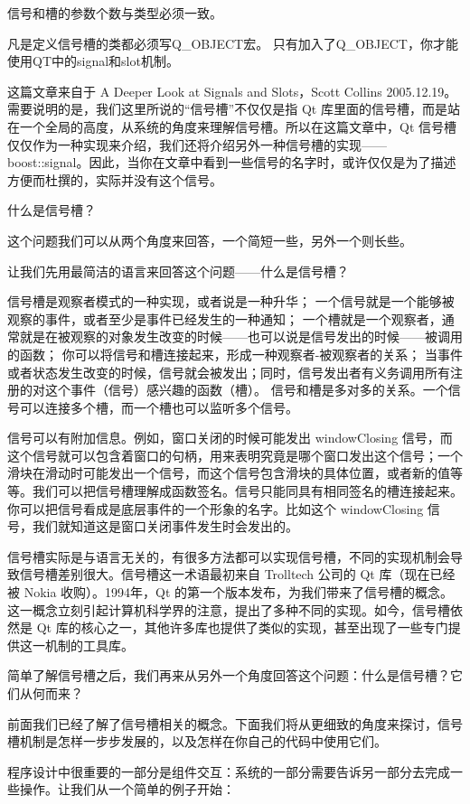信号和槽的参数个数与类型必须一致。

凡是定义信号槽的类都必须写Q\_OBJECT宏。
只有加入了Q\_OBJECT，你才能使用QT中的signal和slot机制。

这篇文章来自于 A Deeper Look at Signals and Slots，Scott Collins 2005.12.19。需要说明的是，我们这里所说的“信号槽”不仅仅是指 Qt 库里面的信号槽，而是站在一个全局的高度，从系统的角度来理解信号槽。所以在这篇文章中，Qt 信号槽仅仅作为一种实现来介绍，我们还将介绍另外一种信号槽的实现——boost::signal。因此，当你在文章中看到一些信号的名字时，或许仅仅是为了描述方便而杜撰的，实际并没有这个信号。

什么是信号槽？

这个问题我们可以从两个角度来回答，一个简短一些，另外一个则长些。

让我们先用最简洁的语言来回答这个问题——什么是信号槽？

信号槽是观察者模式的一种实现，或者说是一种升华；
一个信号就是一个能够被观察的事件，或者至少是事件已经发生的一种通知；
一个槽就是一个观察者，通常就是在被观察的对象发生改变的时候——也可以说是信号发出的时候——被调用的函数；
你可以将信号和槽连接起来，形成一种观察者-被观察者的关系；
当事件或者状态发生改变的时候，信号就会被发出；同时，信号发出者有义务调用所有注册的对这个事件（信号）感兴趣的函数（槽）。
信号和槽是多对多的关系。一个信号可以连接多个槽，而一个槽也可以监听多个信号。

信号可以有附加信息。例如，窗口关闭的时候可能发出 windowClosing 信号，而这个信号就可以包含着窗口的句柄，用来表明究竟是哪个窗口发出这个信号；一个滑块在滑动时可能发出一个信号，而这个信号包含滑块的具体位置，或者新的值等等。我们可以把信号槽理解成函数签名。信号只能同具有相同签名的槽连接起来。你可以把信号看成是底层事件的一个形象的名字。比如这个 windowClosing 信号，我们就知道这是窗口关闭事件发生时会发出的。

信号槽实际是与语言无关的，有很多方法都可以实现信号槽，不同的实现机制会导致信号槽差别很大。信号槽这一术语最初来自 Trolltech 公司的 Qt 库（现在已经被 Nokia 收购）。1994年，Qt 的第一个版本发布，为我们带来了信号槽的概念。这一概念立刻引起计算机科学界的注意，提出了多种不同的实现。如今，信号槽依然是 Qt 库的核心之一，其他许多库也提供了类似的实现，甚至出现了一些专门提供这一机制的工具库。

简单了解信号槽之后，我们再来从另外一个角度回答这个问题：什么是信号槽？它们从何而来？

前面我们已经了解了信号槽相关的概念。下面我们将从更细致的角度来探讨，信号槽机制是怎样一步步发展的，以及怎样在你自己的代码中使用它们。

程序设计中很重要的一部分是组件交互：系统的一部分需要告诉另一部分去完成一些操作。让我们从一个简单的例子开始：

